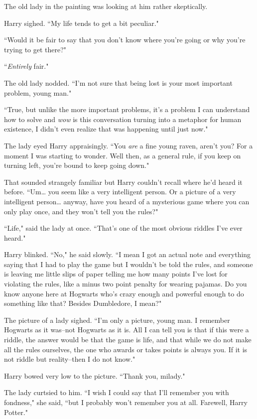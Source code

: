 The old lady in the painting was looking at him rather skeptically.

Harry sighed. ``My life tends to get a bit peculiar."

``Would it be fair to say that you don't know where you're going or why you're trying to get there?"

``\emph{Entirely} fair."

The old lady nodded. ``I'm not sure that being lost is your most important problem, young man."

``True, but unlike the more important problems, it's a problem I can understand how to solve and \emph{wow} is this conversation turning into a metaphor for human existence, I didn't even realize that was happening until just now."

The lady eyed Harry appraisingly. ``You \emph{are} a fine young raven, aren't you? For a moment I was starting to wonder. Well then, as a general rule, if you keep on turning left, you're bound to keep going down."

That sounded strangely familiar but Harry couldn't recall where he'd heard it before. ``Um{\ldots} you seem like a very intelligent person. Or a picture of a very intelligent person{\ldots} anyway, have you heard of a mysterious game where you can only play once, and they won't tell you the rules?"

``Life," said the lady at once. ``That's one of the most obvious riddles I've ever heard."

Harry blinked. ``No," he said slowly. ``I mean I got an actual note and everything saying that I had to play the game but I wouldn't be told the rules, and someone is leaving me little slips of paper telling me how many points I've lost for violating the rules, like a minus two point penalty for wearing pajamas. Do you know anyone here at Hogwarts who's crazy enough and powerful enough to do something like that? Besides Dumbledore, I mean?"

The picture of a lady sighed. ``I'm only a picture, young man. I remember Hogwarts as it was\---not Hogwarts as it is. All I can tell you is that if this were a riddle, the answer would be that the game is life, and that while we do not make all the rules ourselves, the one who awards or takes points is always you. If it is not riddle but reality\---then I do not know."

Harry bowed very low to the picture. ``Thank you, milady."

The lady curtsied to him. ``I wish I could say that I'll remember you with fondness," she said, ``but I probably won't remember you at all. Farewell, Harry Potter."

